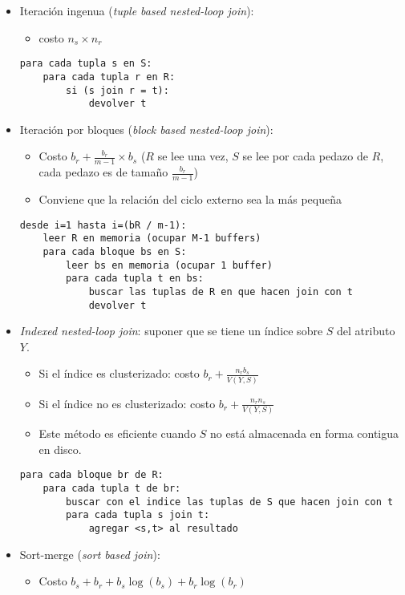 \documentclass[a4paper, twoside]{article}
\begin{document}
\begin{itemize}
	\item Iteración ingenua (\emph{tuple based nested-loop join}): 
	\begin{itemize}
		\item costo $n_{s}\times n_{r}$
	\end{itemize}

	\begin{lstlisting}
para cada tupla s en S:
	para cada tupla r en R:
		si (s join r = t):
			devolver t
	\end{lstlisting}

	\item Iteración por bloques (\emph{block based nested-loop join}): 
	\begin{itemize}
		\item Costo $b_{r}+\frac{b_{r}}{m-1}\times b_{s}$ ($R$ se lee una vez, $S$ se lee por cada pedazo de $R$, cada pedazo es de tamaño $\frac{b_{r}}{m-1}$)
		\item Conviene que la relación del ciclo externo sea la más pequeña
	\end{itemize}

	\begin{lstlisting}
desde i=1 hasta i=(bR / m-1):
	leer R en memoria (ocupar M-1 buffers)
	para cada bloque bs en S:
		leer bs en memoria (ocupar 1 buffer)
		para cada tupla t en bs:
			buscar las tuplas de R en que hacen join con t
			devolver t
	\end{lstlisting}

	\item \emph{Indexed nested-loop join}: suponer que se tiene un índice sobre $S$ del atributo $Y$.
	\begin{itemize}
		\item Si el índice es clusterizado: costo $b_{r}+\frac{n_{r}b_{s}}{V(Y,S)}$
		\item Si el índice no es clusterizado: costo $b_{r}+\frac{n_{r}n_{s}}{V(Y,S)}$
		\item Este método es eficiente cuando $S$ no está almacenada en forma contigua en disco.
	\end{itemize}

	\begin{lstlisting}
para cada bloque br de R:
	para cada tupla t de br:
		buscar con el indice las tuplas de S que hacen join con t
		para cada tupla s join t:
			agregar <s,t> al resultado
	\end{lstlisting}

	\item Sort-merge (\emph{sort based join}): 
	\begin{itemize}
		\item Costo $b_{s}+b_{r}+b_{s}\log(b_{s})+b_{r}\log(b_{r})$
	\end{itemize}


\end{itemize}
\end{document}
